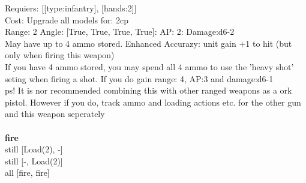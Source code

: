 Requiers: [[type:infantry], [hands:2]] \\
Cost: Upgrade all models for: 2cp \\


Range: 2  Angle: [True, True, True, True]: AP: 2: Damage:d6-2 \\
May have up to 4 ammo stored. Enhanced Accurazy: unit gain +1 to hit (but only when firing this weapon)\\ 
If you have 4 ammo stored, you may spend all 4 ammo to use the 'heavy shot' seting when firing a shot. If you do gain range: 4, AP:3 and damage:d6-1\\ 
 ps! It is nor recommended combining this with other ranged weapons as a ork pistol. However if you do, track ammo and loading actions etc. for the other gun and this weapon seperately\\ 







\ \\ {\bf fire } \\
still [Load(2), -] \\
still [-, Load(2)] \\
all [fire, fire] \\

